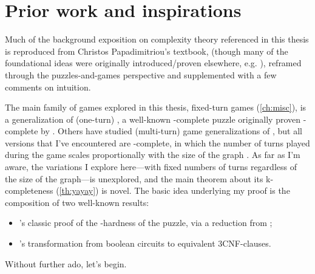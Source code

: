 \section{Prior work and inspirations}

Much of the background exposition on complexity theory referenced in this thesis
is reproduced from Christos Papadimitriou's textbook,
\citet{papadimitriou.cc} (though many of the foundational ideas were
originally introduced/proven elsewhere, e.g.
\citet{cook.np,levin.np,stockmeyer.ph}), reframed through the
puzzles-and-games perspective and supplemented with a few comments on intuition.

The main family of games explored in this thesis, fixed-turn
 games (\cref{ch:misc}), is a generalization of
(one-turn) , a well-known \NP-complete puzzle originally
proven \NP-complete by \citet{karp.np}.  Others have studied (multi-turn)
game generalizations of , but all versions that I've
encountered are \PSPACE-complete, in which the number of turns played during the
game scales proportionally with the size of the graph
\citep{bodlaender.coloring,bh.placement,kbd.impartial,cpss.coloring,schaefer.games}. As far as I'm aware, the variations I explore here—with fixed
numbers of turns regardless of the size of the graph—is unexplored, and the main
theorem about its \SigmaP k-completeness (\cref{th:yayay}) is novel.  The basic
idea underlying my proof is the composition of two well-known results:
\begin{itemize}[nosep]
  \item \citet{karp.np}'s classic proof of the \NP-hardness of the  puzzle, via a reduction from ;
  \item 's transformation from boolean circuits to equivalent 3CNF-clauses.
\end{itemize}

Without further ado, let's begin.



%











